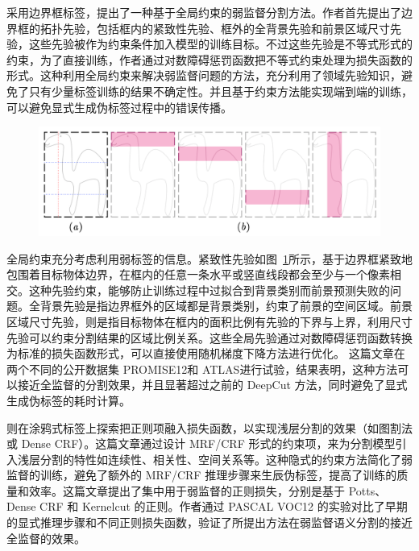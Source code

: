 \citet{kervadec2020bounding} 采用边界框标签，提出了一种基于全局约束的弱监督分割方法。作者首先提出了边界框的拓扑先验，包括框内的紧致性先验、框外的全背景先验和前景区域尺寸先验，这些先验被作为约束条件加入模型的训练目标。不过这些先验是不等式形式的约束，为了直接训练，作者通过对数障碍惩罚函数把不等式约束处理为损失函数的形式。这种利用全局约束来解决弱监督问题的方法，充分利用了领域先验知识，避免了只有少量标签训练的结果不确定性。并且基于约束方法能实现端到端的训练，可以避免显式生成伪标签过程中的错误传播。
    \begin{figure}[tbp]
        \centering 
        \includegraphics[width=1.0\textwidth]{img/c2/rel_a6.png}
        \label{c2_fig6}
    \end{figure}
全局约束充分考虑利用弱标签的信息。紧致性先验如图~\ref{c2_fig6}所示，基于边界框紧致地包围着目标物体边界，在框内的任意一条水平或竖直线段都会至少与一个像素相交。这种先验约束，能够防止训练过程中过拟合到背景类别而前景预测失败的问题。全背景先验是指边界框外的区域都是背景类别，约束了前景的空间区域。前景区域尺寸先验，则是指目标物体在框内的面积比例有先验的下界与上界，利用尺寸先验可以约束分割结果的区域比例关系。这些全局先验通过对数障碍惩罚函数转换为标准的损失函数形式，可以直接使用随机梯度下降方法进行优化。
这篇文章在两个不同的公开数据集 PROMISE12\citep{Litjens2014EvaluationOP}和 ATLAS\citep{Liew2018ALO}进行试验，结果表明，这种方法可以接近全监督的分割效果，并且显著超过之前的 DeepCut 方法，同时避免了显式生成伪标签的耗时计算。

\citet{tang2018regularized}则在涂鸦式标签上探索把正则项融入损失函数，以实现浅层分割的效果（如图割法或 Dense CRF）。这篇文章通过设计 MRF/CRF 形式的约束项，来为分割模型引入浅层分割的特性如连续性、相关性、空间关系等。这种隐式的约束方法简化了弱监督的训练，避免了额外的 MRF/CRF 推理步骤来生辰伪标签，提高了训练的质量和效率。这篇文章提出了集中用于弱监督的正则损失，分别是基于 Potts、Dense CRF 和 Kernelcut 的正则。作者通过 PASCAL VOC12 的实验对比了早期的显式推理步骤和不同正则损失函数，验证了所提出方法在弱监督语义分割的接近全监督的效果。


